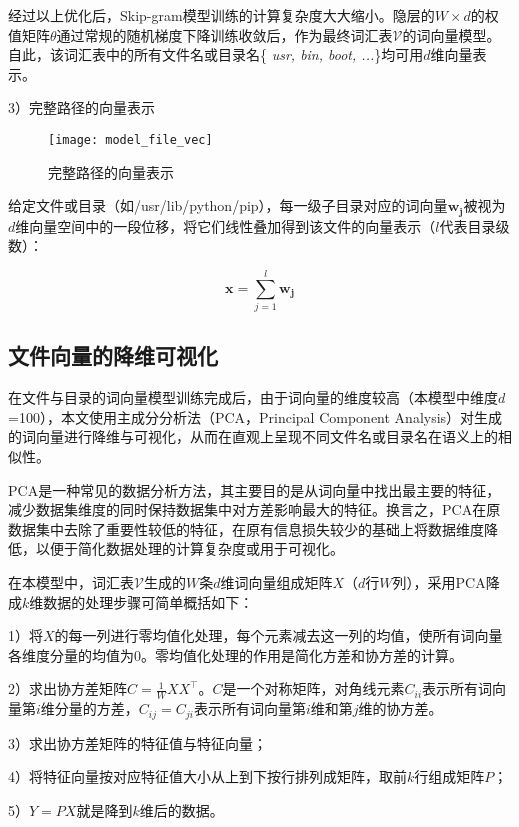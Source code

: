 经过以上优化后，Skip-gram模型训练的计算复杂度大大缩小。隐层的$W\times d$的权值矩阵$\theta$通过常规的随机梯度下降训练收敛后，作为最终词汇表$\mathcal{V}$的词向量模型。自此，该词汇表中的所有文件名或目录名\{ \textit{usr, bin, boot, ...}\}均可用$d$维向量表示。

3）完整路径的向量表示

\begin{figure}[htp]
\centering
\texttt{[image: model\_file\_vec]}
\caption{完整路径的向量表示}
\label{fig:model_file_vec}
\end{figure}
给定文件或目录（如/usr/lib/python/pip），每一级子目录对应的词向量$\mathbf{w_j}$被视为$d$维向量空间中的一段位移，将它们线性叠加得到该文件的向量表示（$l$代表目录级数）：

\begin{equation}
    \mathbf{x} = \sum_{j=1}^l \mathbf{w_j}
\end{equation}

\subsection{文件向量的降维可视化}

在文件与目录的词向量模型训练完成后，由于词向量的维度较高（本模型中维度$d$=100），本文使用主成分分析法（PCA，Principal Component Analysis）对生成的词向量进行降维与可视化，从而在直观上呈现不同文件名或目录名在语义上的相似性。

PCA是一种常见的数据分析方法，其主要目的是从词向量中找出最主要的特征，减少数据集维度的同时保持数据集中对方差影响最大的特征。换言之，PCA在原数据集中去除了重要性较低的特征，在原有信息损失较少的基础上将数据维度降低，以便于简化数据处理的计算复杂度或用于可视化。

在本模型中，词汇表$\mathcal{V}$生成的$W$条$d$维词向量组成矩阵$X$（$d$行$W$列），采用PCA降成$k$维数据的处理步骤可简单概括如下：

1）将$X$的每一列进行零均值化处理，每个元素减去这一列的均值，使所有词向量各维度分量的均值为0。零均值化处理的作用是简化方差和协方差的计算。

2）求出协方差矩阵$C = \frac{1}{W} XX^{\top}$。$C$是一个对称矩阵，对角线元素$C_{ii}$表示所有词向量第$i$维分量的方差，$C_{ij}=C_{ji}$表示所有词向量第$i$维和第$j$维的协方差。

3）求出协方差矩阵的特征值与特征向量；

4）将特征向量按对应特征值大小从上到下按行排列成矩阵，取前$k$行组成矩阵$P$；

5）$Y=PX$就是降到$k$维后的数据。


